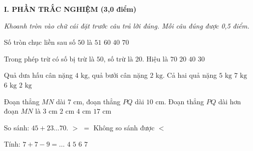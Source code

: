 
\setcounter{ex}{0}
\setcounter{bt}{0}

\textbf{\large I. PHẦN TRẮC NGHIỆM (3,0 điểm)}

{\itshape Khoanh tròn vào chữ cái đặt trước câu trả lời đúng. Mỗi câu đúng được 0,5 điểm.}

\begin{ex} %
Số tròn chục liền sau số $50$ là
\choice
{$51$}
{\True $60$}
{$40$}
{$70$}
\end{ex}

\begin{ex} %
Trong phép trừ có số bị trừ là $50$, số trừ là $20$. Hiệu là
\choice
{$70$}
{$20$}
{$40$}
{\True $30$}
\end{ex}

\begin{ex} %
Quả dưa hấu cân nặng $4\text{ kg}$, quả bưởi cân nặng $2\text{ kg}$. Cả hai quả nặng
\choice
{$5\text{ kg}$}
{$7\text{ kg}$}
{\True $6\text{ kg}$}
{$2\text{ kg}$}
\end{ex}

\begin{ex} %
Đoạn thẳng $MN$ dài $7\text{ cm}$, đoạn thẳng $PQ$ dài $10\text{ cm}$. Đoạn thẳng $PQ$ dài hơn đoạn $MN$ là
\choice
{\True $3\text{ cm}$}
{$2\text{ cm}$}
{$4\text{ cm}$}
{$17\text{ cm}$}
\end{ex}

\begin{ex} %
So sánh: $45 + 23 \dots 70$.
\choice
{$>$}
{$=$}
{Không so sánh được}
{\True $<$}
\end{ex}

\begin{ex} %
Tính: $7 + 7 - 9 = \dots$
\choice
{$4$}
{\True $5$}
{$6$}
{$7$}
\end{ex}

